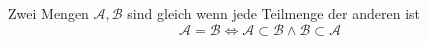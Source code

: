 Zwei Mengen $\mathcal{A}, \mathcal{B}$ sind gleich wenn jede Teilmenge der anderen ist
$$\mathcal{A} = \mathcal{B} \iff \mathcal{A} \subset \mathcal{B} \land \mathcal{B} \subset \mathcal{A}$$
